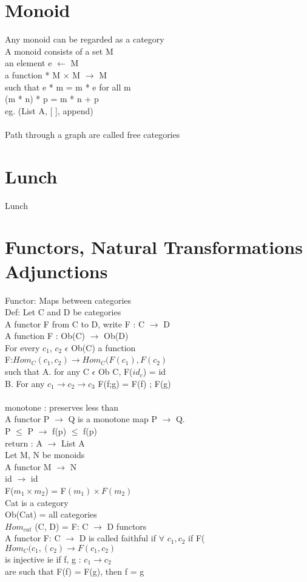\documentclass{article}
\begin{document}
\section{Monoid}
Any monoid can be regarded as a category
\\
A monoid consists of a set M
\\
an element e $\leftarrow$ M
\\
a function * M $\times$ M $\rightarrow$ M
\\
such that e * m = m * e for all m
\\
(m * n) * p = m * n + p
\\
eg. (List A, [ ], append)
\\
\\
Path through a graph are called free categories
\\
\section{Lunch}
Lunch
\section{Functors, Natural Transformations Adjunctions}
Functor: Maps between categories
\\
Def: Let C and D be categories
\\
A functor F from C to D, write F : C $\rightarrow$ D
\\
A function F : Ob(C) $\rightarrow$ Ob(D)
\\
For every $c_{1}$, $c_{2}$ $\epsilon$ Ob(C) a function
\\
F:$Hom_{C}(c_{1}, c_{2}) \rightarrow Hom_{C}(F(c_{1}), F(c_{2})$
\\
such that 
A. for any C $\epsilon$ Ob C, F($id_{c}$) = id
\\
B. For any $c_{1} \rightarrow c_{2} \rightarrow c_{3}$
F(f;g) = F(f) ; F(g)
\\
\\
monotone : preserves less than
\\
A functor P $\rightarrow$ Q is a monotone map P $\rightarrow$ Q.
\\
P $\leq$ P $\rightarrow$ f(p) $\leq$ f(p)
\\
return : A $\rightarrow$ List A
\\
Let M, N be monoids
\\
A functor M $\rightarrow$ N
\\
id $\rightarrow$ id
\\
F($m_{1} \times m_{2}$) = F$(m_{1}) \times F(m_{2})$
\\
Cat is a category
\\
Ob(Cat) = all categories
\\
$Hom_{cat}$ (C, D) = F: C $\rightarrow$ D functors
\\
A functor F: C $\rightarrow$ D is called faithful if
$\forall$ $c_{1}, c_{2}$ if F($Hom_{C}(c_{1}, (c_{2}) \rightarrow F(c_{1}, c_{2})$ 
\\
is injective ie if f, g : $c_{1} \rightarrow c_{2}$
\\
are such that F(f) = F(g), then f = g
\\
\end{document}
